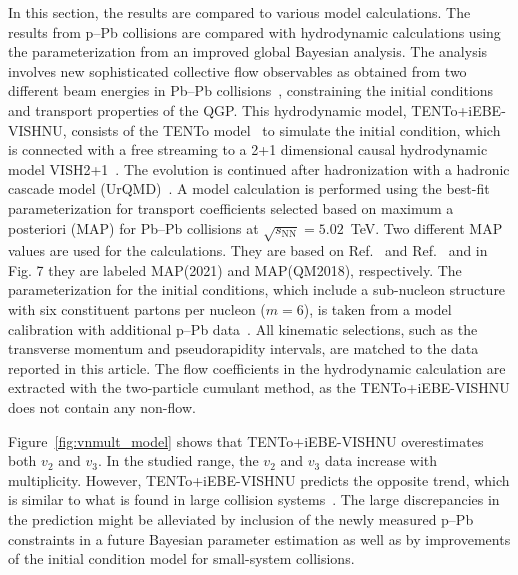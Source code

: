 In this section, the results are compared to various model calculations.
The results from p--Pb collisions are compared with hydrodynamic calculations using the parameterization from an improved global
Bayesian analysis. The analysis involves new sophisticated collective flow observables as obtained from two different beam energies in Pb--Pb collisions~\cite{Parkkila:2021yha}, constraining the initial conditions and transport properties of the QGP. This hydrodynamic model, {TENTo}+iEBE-VISHNU, consists of the {TENTo} model~\cite{Moreland:2014oya} to simulate the initial condition, which is connected with a free streaming to a 2+1 dimensional causal hydrodynamic model VISH2+1~\cite{Shen:2014vra}. The evolution is continued after hadronization with a hadronic cascade model (UrQMD)~\cite{Bass:1998ca,Bleicher:1999xi}. 
A model calculation is performed using the best-fit parameterization for transport coefficients selected based on maximum a posteriori (MAP) for Pb--Pb collisions at $\sqrt{s_{\text{NN}}}=5.02$~TeV. Two different MAP values are used for the calculations. They are based on Ref.~\cite{Parkkila:2021yha} and Ref.~\cite{Bernhard:2016tnd} and in Fig. 7 they
are labeled MAP(2021) and MAP(QM2018), respectively.
 The parameterization for the initial conditions, which include a sub-nucleon structure with six constituent partons per nucleon ($m=6$), is taken from a model calibration with additional p--Pb data~\cite{Moreland:2018gsh}. All kinematic selections, such as the transverse momentum and pseudorapidity intervals, are matched to the data reported in this article. The flow coefficients in the hydrodynamic calculation are extracted with the two-particle cumulant method, as the {TENTo}+iEBE-VISHNU does not contain any non-flow.

Figure~\ref{fig:vnmult_model} shows that {TENTo}+iEBE-VISHNU overestimates both $v_2$ and $v_3$. In the studied range, the $v_2$ and $v_3$ data increase with multiplicity. However, {TENTo}+iEBE-VISHNU predicts the opposite trend, which is similar to what is found in large collision systems~\cite{Acharya:2020taj}. The large discrepancies in the prediction might be alleviated by inclusion of the newly measured p--Pb constraints in a future Bayesian parameter estimation as well as by improvements of the initial condition model for small-system collisions.

